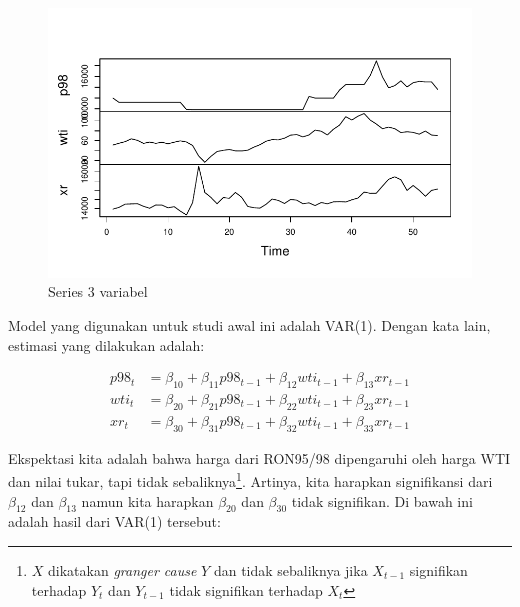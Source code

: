 \documentclass[
  a4paper,
  DIV=11,
  numbers=noendperiod]{scrreprt}
\begin{document}
\begin{figure}

{\centering \includegraphics{index_files/figure-pdf/fig-var-1.pdf}

}

\caption{\label{fig-var}Series 3 variabel}

\end{figure}

Model yang digunakan untuk studi awal ini adalah VAR(1). Dengan kata
lain, estimasi yang dilakukan adalah:

\[
\begin{align*}
p98_t&=\beta_{10}+\beta_{11} p98_{t-1}+\beta_{12} wti_{t-1}+\beta_{13} xr_{t-1} \\
wti_t&=\beta_{20}+\beta_{21} p98_{t-1}+\beta_{22} wti_{t-1}+\beta_{23} xr_{t-1} \\
xr_t&=\beta_{30}+\beta_{31} p98_{t-1}+\beta_{32} wti_{t-1}+\beta_{33} xr_{t-1}
\end{align*}
\]

Ekspektasi kita adalah bahwa harga dari RON95/98 dipengaruhi oleh harga
WTI dan nilai tukar, tapi tidak sebaliknya\footnote{\(X\) dikatakan
  \emph{granger cause} \(Y\) dan tidak sebaliknya jika \(X_{t-1}\)
  signifikan terhadap \(Y_t\) dan \(Y_{t-1}\) tidak signifikan terhadap
  \(X_t\)}. Artinya, kita harapkan signifikansi dari \(\beta_{12}\) dan
\(\beta_{13}\) namun kita harapkan \(\beta_{20}\) dan \(\beta_{30}\)
tidak signifikan. Di bawah ini adalah hasil dari VAR(1) tersebut:
\end{document}
